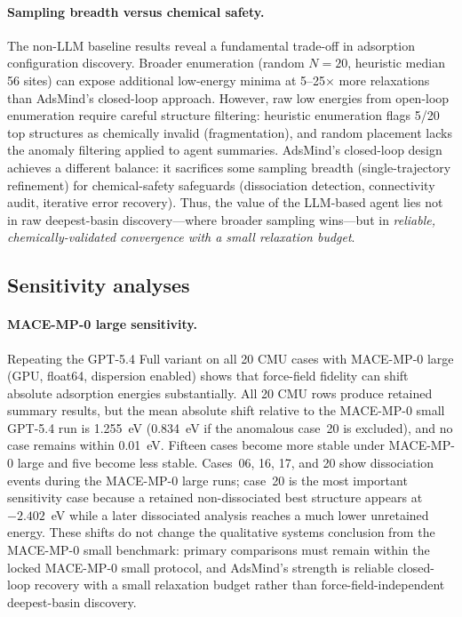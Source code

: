 \paragraph{Sampling breadth versus chemical safety.}
The non-LLM baseline results reveal a fundamental trade-off in adsorption configuration discovery.
Broader enumeration (random $N=20$, heuristic median 56 sites) can expose additional low-energy minima at 5--25$\times$ more relaxations than AdsMind's closed-loop approach.
However, raw low energies from open-loop enumeration require careful structure filtering: heuristic enumeration flags 5/20 top structures as chemically invalid (fragmentation), and random placement lacks the anomaly filtering applied to agent summaries.
AdsMind's closed-loop design achieves a different balance: it sacrifices some sampling breadth (single-trajectory refinement) for chemical-safety safeguards (dissociation detection, connectivity audit, iterative error recovery).
Thus, the value of the LLM-based agent lies not in raw deepest-basin discovery---where broader sampling wins---but in \textit{reliable, chemically-validated convergence with a small relaxation budget}.

\subsection{Sensitivity analyses}

\paragraph{MACE-MP-0 large sensitivity.}
Repeating the GPT-5.4 Full variant on all 20 CMU cases with MACE-MP-0 large (GPU, float64, dispersion enabled) shows that force-field fidelity can shift absolute adsorption energies substantially.
All 20 CMU rows produce retained summary results, but the mean absolute shift relative to the MACE-MP-0 small GPT-5.4 run is 1.255~eV (0.834~eV if the anomalous case~20 is excluded), and no case remains within 0.01~eV.
Fifteen cases become more stable under MACE-MP-0 large and five become less stable.
Cases~06, 16, 17, and 20 show dissociation events during the MACE-MP-0 large runs; case~20 is the most important sensitivity case because a retained non-dissociated best structure appears at $-2.402$~eV while a later dissociated analysis reaches a much lower unretained energy.
These shifts do not change the qualitative systems conclusion from the MACE-MP-0 small benchmark: primary comparisons must remain within the locked MACE-MP-0 small protocol, and AdsMind's strength is reliable closed-loop recovery with a small relaxation budget rather than force-field-independent deepest-basin discovery.

